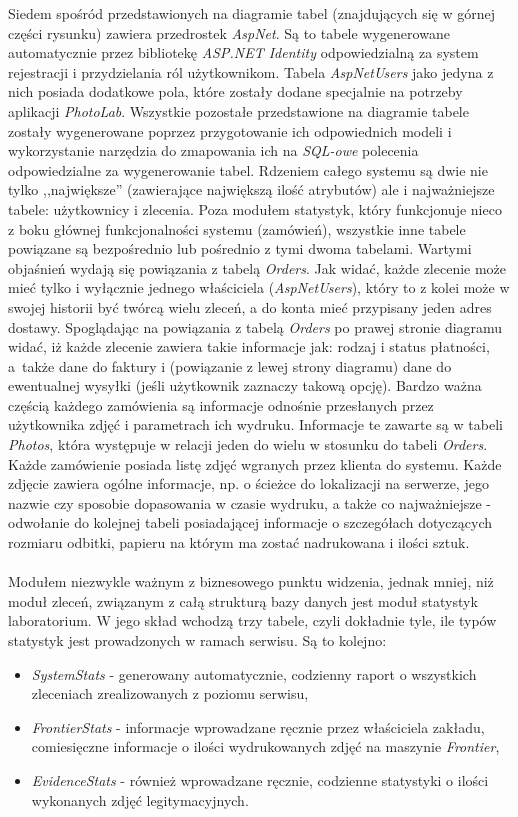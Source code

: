 \noindent Siedem spośród przedstawionych na diagramie tabel (znajdujących się w górnej części rysunku) zawiera przedrostek \textit{AspNet}. Są to tabele wygenerowane automatycznie przez bibliotekę \textit{ASP.NET Identity} odpowiedzialną za system rejestracji i przydzielania ról użytkownikom. Tabela \textit{AspNetUsers} jako jedyna z nich posiada dodatkowe pola, które zostały dodane specjalnie na potrzeby aplikacji \textit{PhotoLab}. Wszystkie pozostałe przedstawione na diagramie tabele zostały wygenerowane poprzez przygotowanie ich odpowiednich modeli i wykorzystanie narzędzia do zmapowania ich na \textit{SQL-owe} polecenia odpowiedzialne za wygenerowanie tabel. Rdzeniem całego systemu są dwie nie tylko ,,największe'' (zawierające największą ilość atrybutów) ale i najważniejsze tabele: użytkownicy i zlecenia. Poza modułem statystyk, który funkcjonuje nieco z boku głównej funkcjonalności systemu (zamówień), wszystkie inne tabele powiązane są bezpośrednio lub pośrednio z tymi dwoma tabelami. Wartymi objaśnień wydają się powiązania z tabelą \textit{Orders}. Jak widać, każde zlecenie może mieć tylko i wyłącznie jednego właściciela (\textit{AspNetUsers}), który to z kolei może w swojej historii być twórcą wielu zleceń, a do konta mieć przypisany jeden adres dostawy. Spoglądając na powiązania z tabelą \textit{Orders} po prawej stronie diagramu widać, iż każde zlecenie zawiera takie informacje jak: rodzaj i status płatności, a~także dane do faktury i (powiązanie z lewej strony diagramu) dane do ewentualnej wysyłki (jeśli użytkownik zaznaczy takową opcję). Bardzo ważna częścią każdego zamówienia są informacje odnośnie przesłanych przez użytkownika zdjęć i parametrach ich wydruku. Informacje te zawarte są w tabeli \textit{Photos}, która występuje w relacji jeden do wielu w stosunku do tabeli \textit{Orders}. Każde zamówienie posiada listę zdjęć wgranych przez klienta do systemu. Każde zdjęcie zawiera ogólne informacje, np. o ścieżce do lokalizacji na serwerze, jego nazwie czy sposobie dopasowania w czasie wydruku, a także co najważniejsze - odwołanie do kolejnej tabeli posiadającej informacje o szczegółach dotyczących rozmiaru odbitki, papieru na którym ma zostać nadrukowana i ilości sztuk.\\
\\
Modułem niezwykle ważnym z biznesowego punktu widzenia, jednak mniej, niż moduł zleceń, związanym z całą strukturą bazy danych jest moduł statystyk laboratorium. W jego skład wchodzą trzy tabele, czyli dokładnie tyle, ile typów statystyk jest prowadzonych w ramach serwisu. Są to kolejno:
\begin{itemize}
    \item \textit{SystemStats} - generowany automatycznie, codzienny raport o wszystkich zleceniach zrealizowanych z poziomu serwisu,
    \item \textit{FrontierStats} - informacje wprowadzane ręcznie przez właściciela zakładu, comiesięczne informacje o ilości wydrukowanych zdjęć na maszynie \textit{Frontier},
    \item \textit{EvidenceStats} - również wprowadzane ręcznie, codzienne statystyki o ilości wykonanych zdjęć legitymacyjnych.
\end{itemize}


